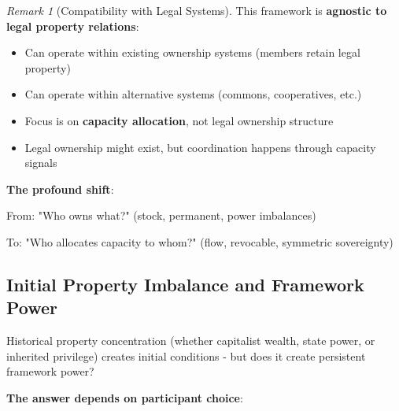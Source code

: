 \documentclass[11pt,a4paper]{article}
\theoremstyle{definition}
\theoremstyle{remark}
\newtheorem{remark}[theorem]{Remark}
\begin{document}
\begin{remark}[Compatibility with Legal Systems]
This framework is \textbf{agnostic to legal property relations}:
\begin{itemize}
\item Can operate within existing ownership systems (members retain legal property)
\item Can operate within alternative systems (commons, cooperatives, etc.)
\item Focus is on \textbf{capacity allocation}, not legal ownership structure
\item Legal ownership might exist, but coordination happens through capacity signals
\end{itemize}
\end{remark}

\textbf{The profound shift}:

From: "Who owns what?" (stock, permanent, power imbalances)

To: "Who allocates capacity to whom?" (flow, revocable, symmetric sovereignty)

\subsection{Initial Property Imbalance and Framework Power}

Historical property concentration (whether capitalist wealth, state power, or inherited privilege) creates initial conditions - but does it create persistent framework power?

\textbf{The answer depends on participant choice}:

\begin{center}
\end{center}
\end{document}
